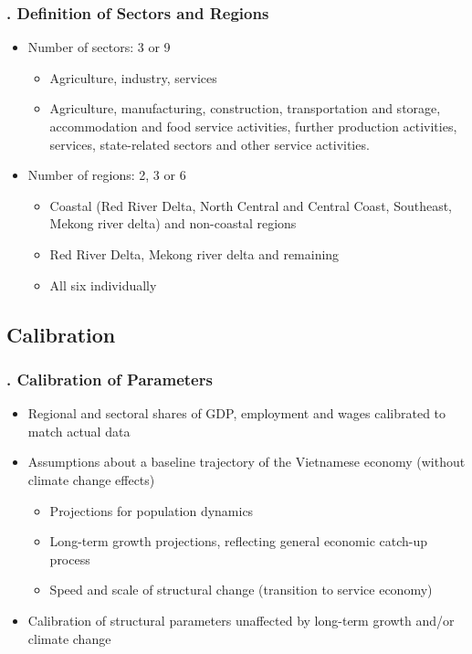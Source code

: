 \documentclass[11pt,aspectratio=169]{beamer}
\begin{document}
\begin{frame}
\frametitle{{\thesection.\thesubsection} Definition of Sectors and Regions}
\begin{itemize}
\item Number of sectors: 3 or 9
	\begin{itemize}
		\item Agriculture, industry, services
		\item Agriculture, manufacturing, construction, transportation and storage, accommodation and food service activities, further production activities, services, state-related sectors and other service activities.
	\end{itemize}	
\item Number of regions: 2, 3 or 6
	\begin{itemize}
		\item Coastal (Red River Delta, North Central and Central Coast, Southeast, Mekong river delta) and non-coastal regions
		\item Red River Delta, Mekong river delta and remaining
		\item All six individually
	\end{itemize}	
\end{itemize}
\end{frame}

\subsection{Calibration}
\begin{frame}
\frametitle{{\thesection.\thesubsection} Calibration of Parameters}
\begin{itemize}
\item Regional and sectoral shares of GDP, employment and wages calibrated to match actual data
\item Assumptions about a baseline trajectory of the Vietnamese economy (without climate change effects)
	\begin{itemize}
		\item Projections for population dynamics
		\item Long-term growth projections, reflecting general economic catch-up process
		\item Speed and scale of structural change (transition to service economy)
\end{itemize}
\item Calibration of structural parameters unaffected by long-term growth and/or climate change
\end{itemize}
\end{frame}
\end{document}
